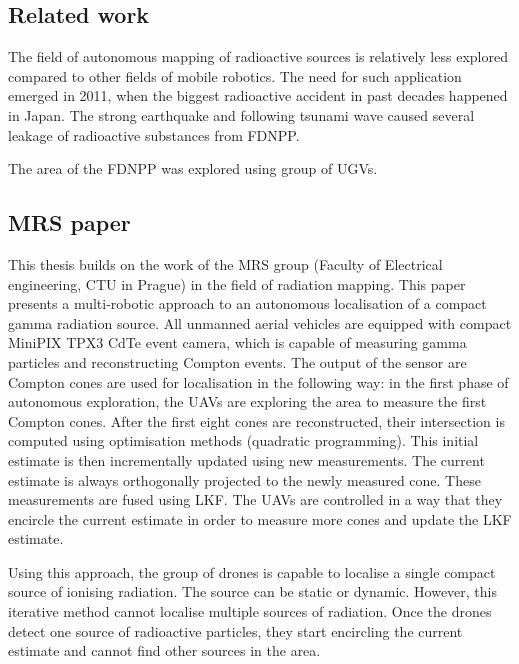 
\subsection{Related work}
The field of autonomous mapping of radioactive sources is relatively less explored compared to other fields of mobile robotics. 
The need for such application emerged in 2011, when the biggest radioactive accident in past decades happened in Japan.
The strong earthquake and following tsunami wave caused several leakage of radioactive substances from \ac{FDNPP}.
  
The area of the \ac{FDNPP} was explored using group of \ac{UGV}s. 

\subsection{ MRS paper}
This thesis builds on the work of the MRS group (Faculty of Electrical engineering, CTU in Prague) in the field of radiation mapping. 
This paper \cite{baca2021gamma} presents a multi-robotic approach to an autonomous localisation of a compact gamma radiation source. 
All unmanned aerial vehicles are equipped with compact MiniPIX TPX3 CdTe event camera, which is capable of measuring gamma particles and reconstructing Compton events. 
The output of the sensor are Compton cones are used for localisation in the following way:
in the first phase of autonomous exploration, the \ac{UAV}s are exploring the area to measure the first Compton cones. 
After the first eight cones are reconstructed, their intersection is computed using optimisation methods (quadratic programming). 
This initial estimate is then incrementally updated using new measurements. 
The current estimate is always orthogonally projected to the newly measured cone. 
These measurements are fused using \ac{LKF}. 
The \ac{UAV}s are controlled in a way that they encircle the current estimate in order to measure more cones and update the \ac{LKF} estimate.

Using this approach, the group of drones is capable to localise a single compact source of ionising radiation. 
The source can be static or dynamic. 
However, this iterative method cannot localise multiple sources of radiation.
Once the drones detect one source of radioactive particles, they start encircling the current estimate and cannot find other sources in the area.

